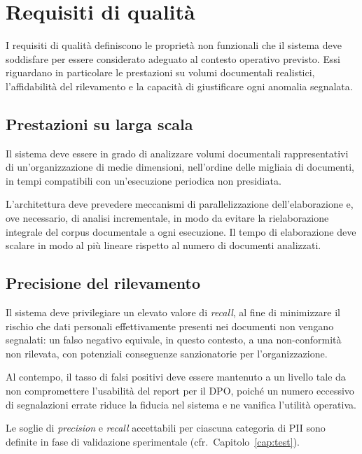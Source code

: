 
\section{Requisiti di qualità}
\label{sec:requisiti-qualita}

I requisiti di qualità definiscono le proprietà non funzionali che il sistema deve soddisfare per essere considerato adeguato al contesto operativo previsto. Essi riguardano in particolare le prestazioni su volumi documentali realistici, l'affidabilità del rilevamento e la capacità di giustificare ogni anomalia segnalata.

\subsection{Prestazioni su larga scala}
\label{sub:prestazioni}
Il sistema deve essere in grado di analizzare volumi documentali rappresentativi di un'organizzazione di medie dimensioni, nell'ordine delle migliaia di documenti, in tempi compatibili con un'esecuzione periodica non presidiata. \medskip

L'architettura deve prevedere meccanismi di parallelizzazione dell'elaborazione e, ove necessario, di analisi incrementale, in modo da evitare la rielaborazione integrale del corpus documentale a ogni esecuzione. Il tempo di elaborazione deve scalare in modo al più lineare rispetto al numero di documenti analizzati.

\subsection{Precisione del rilevamento}
\label{sub:precisione}
Il sistema deve privilegiare un elevato valore di \textit{recall}, al fine di minimizzare il rischio che dati personali effettivamente presenti nei documenti non vengano segnalati: un falso negativo equivale, in questo contesto, a una non-conformità non rilevata, con potenziali conseguenze sanzionatorie per l'organizzazione. \medskip

Al contempo, il tasso di falsi positivi deve essere mantenuto a un livello tale da non compromettere l'usabilità del report per il DPO, poiché un numero eccessivo di segnalazioni errate riduce la fiducia nel sistema e ne vanifica l'utilità operativa. \medskip

Le soglie di \textit{precision} e \textit{recall} accettabili per ciascuna categoria di PII sono definite in fase di validazione sperimentale (cfr.~Capitolo~\ref{cap:test}).

